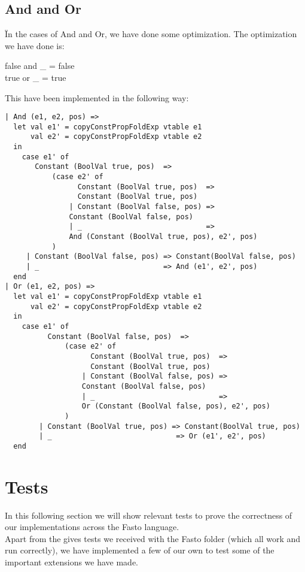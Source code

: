 \documentclass[12pt]{article}
\begin{document}
\subsection{And and Or}
Ïn the cases of And and Or, we have done some optimization. The optimization we have done is:
\begin{center}
false and \_ = false\\
true or \_ = true
\end{center}
This have been implemented in the following way:
\begin{verbatim}
| And (e1, e2, pos) =>
  let val e1' = copyConstPropFoldExp vtable e1
      val e2' = copyConstPropFoldExp vtable e2
  in 
    case e1' of
       Constant (BoolVal true, pos)  => 
           (case e2' of
                 Constant (BoolVal true, pos)  => 
                 Constant (BoolVal true, pos)
               | Constant (BoolVal false, pos) => 
               Constant (BoolVal false, pos)
               | _                             => 
               And (Constant (BoolVal true, pos), e2', pos)
           )
     | Constant (BoolVal false, pos) => Constant(BoolVal false, pos)
     | _                             => And (e1', e2', pos)
  end
| Or (e1, e2, pos) =>
  let val e1' = copyConstPropFoldExp vtable e1
      val e2' = copyConstPropFoldExp vtable e2
  in 
    case e1' of
          Constant (BoolVal false, pos)  => 
              (case e2' of
                    Constant (BoolVal true, pos)  => 
                    Constant (BoolVal true, pos)
                  | Constant (BoolVal false, pos) => 
                  Constant (BoolVal false, pos)
                  | _                             => 
                  Or (Constant (BoolVal false, pos), e2', pos)
              )
        | Constant (BoolVal true, pos) => Constant(BoolVal true, pos)
        | _                             => Or (e1', e2', pos)
  end
\end{verbatim}

\section{Tests}
In this following section we will show relevant tests to prove the correctness of our implementations across the Fasto language.\\
Apart from the gives tests we received with the Fasto folder (which all work and run correctly), we have implemented a few of our own to test some of the important extensions we have made.
\end{document}
